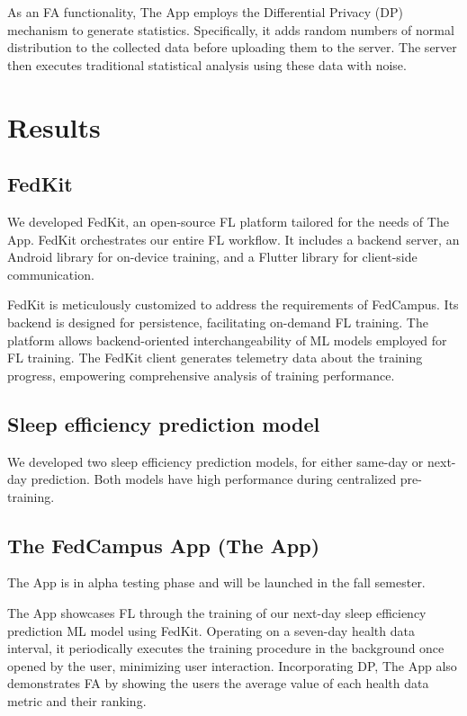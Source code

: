 \documentclass{article}
\begin{document}
\begin{multicols}{2}
As an FA functionality, The App employs the Differential Privacy (DP)
mechanism to generate statistics. Specifically, it adds random numbers
of normal distribution to the collected data before uploading them to
the server. The server then executes traditional statistical analysis
using these data with noise.

\section{Results}

\subsection{FedKit}

We developed FedKit, an open-source FL platform tailored for the needs
of The App. FedKit orchestrates our entire FL workflow. It includes a
backend server, an Android library for on-device training, and a Flutter
library for client-side communication.

FedKit is meticulously customized to address the requirements of
FedCampus. Its backend is designed for persistence, facilitating
on-demand FL training. The platform allows backend-oriented
interchangeability of ML models employed for FL training. The FedKit
client generates telemetry data about the training progress, empowering
comprehensive analysis of training performance.

\subsection{Sleep efficiency prediction model}

We developed two sleep efficiency prediction models, for either same-day
or next-day prediction. Both models have high performance during
centralized pre-training.

\subsection{The FedCampus App (The App)}

The App is in alpha testing phase and will be launched in the fall
semester.

The App showcases FL through the training of our next-day sleep
efficiency prediction ML model using FedKit. Operating on a seven-day
health data interval, it periodically executes the training procedure in
the background once opened by the user, minimizing user interaction.
Incorporating DP, The App also demonstrates FA by showing the users the
average value of each health data metric and their ranking.


\end{multicols}
\end{document}
